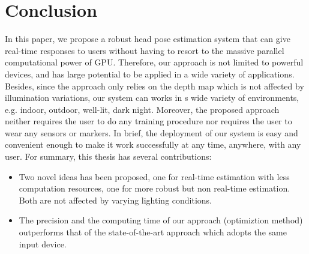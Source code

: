 \chapter{Conclusion}
\label{c:conclusion}

In this paper, we propose a robust head pose estimation system that can give real-time responses to users without
having to resort to the massive parallel computational power of GPU. Therefore, our approach is not limited to powerful devices, and has large potential to be applied in a wide variety of applications. Besides, since the approach only relies on the depth map which is not affected by illumination variations, our system can works in s wide variety of environments, e.g. indoor, outdoor, well-lit, dark night. Moreover, the proposed approach neither requires the user to do any training procedure nor requires the user to wear any sensors or markers. In brief, the deployment of our system is easy and convenient enough to make it work successfully at any time, anywhere, with any user. 
For summary, this thesis has several contributions: 
\begin{itemize}
 \item Two novel ideas has been proposed, one for real-time estimation with less computation resources, one for more robust but non real-time estimation. Both are not affected by varying lighting conditions.
 \item The precision and the computing time of our approach (optimiztion method) outperforms that of the
state-of-the-art approach\cite{Fanelli:11:RTHPEWRRF, fanelli_DAGM11} which adopts the same input device.
\end{itemize}

